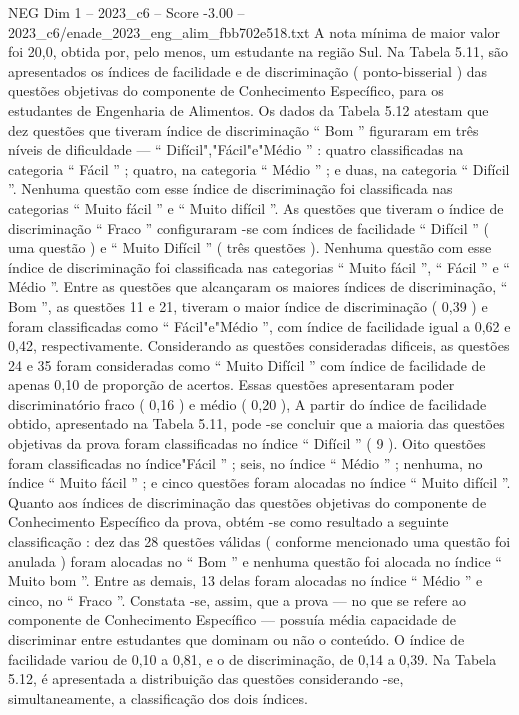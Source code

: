 \begin{textsample}{NEG Dim 1 – 2023\_c6 – Score -3.00 – 2023\_c6/enade\_2023\_eng\_alim\_fbb702e518.txt}
A nota mínima de maior valor foi 20,0, obtida por, pelo menos, um estudante na região Sul.
Na Tabela 5.11, são apresentados os índices de facilidade e de discriminação ( ponto-bisserial ) das questões objetivas do componente de Conhecimento Específico, para os estudantes de Engenharia de Alimentos.
Os dados da Tabela 5.12 atestam que dez questões que tiveram índice de discriminação “ Bom ” figuraram em três níveis de dificuldade — “ Difícil","Fácil"e"Médio ” : quatro classificadas na categoria “ Fácil ” ; quatro, na categoria “ Médio ” ; e duas, na categoria “ Difícil ”.
Nenhuma questão com esse índice de discriminação foi classificada nas categorias “ Muito fácil ” e “ Muito difícil ”.
As questões que tiveram o índice de discriminação “ Fraco ” configuraram -se com índices de facilidade “ Difícil ” ( uma questão ) e “ Muito Difícil ” ( três questões ).
Nenhuma questão com esse índice de discriminação foi classificada nas categorias “ Muito fácil ”, “ Fácil ” e “ Médio ”.
Entre as questões que alcançaram os maiores índices de discriminação, “ Bom ”, as questões 11 e 21, tiveram o maior índice de discriminação ( 0,39 ) e foram classificadas como “ Fácil"e"Médio ”, com índice de facilidade igual a 0,62 e 0,42, respectivamente.
Considerando as questões consideradas dificeis, as questões 24 e 35 foram consideradas como “ Muito Difícil ” com índice de facilidade de apenas 0,10 de proporção de acertos.
Essas questões apresentaram poder discriminatório fraco ( 0,16 ) e médio ( 0,20 ), A partir do índice de facilidade obtido, apresentado na Tabela 5.11, pode -se concluir que a maioria das questões objetivas da prova foram classificadas no índice “ Difícil ” ( 9 ).
Oito questões foram classificadas no índice"Fácil ” ; seis, no índice “ Médio ” ; nenhuma, no índice “ Muito fácil ” ; e cinco questões foram alocadas no índice “ Muito difícil ”.
Quanto aos índices de discriminação das questões objetivas do componente de Conhecimento Específico da prova, obtém -se como resultado a seguinte classificação : dez das 28 questões válidas ( conforme mencionado uma questão foi anulada ) foram alocadas no “ Bom ” e nenhuma questão foi alocada no índice “ Muito bom ”.
Entre as demais, 13 delas foram alocadas no índice “ Médio ” e cinco, no “ Fraco ”.
Constata -se, assim, que a prova — no que se refere ao componente de Conhecimento Específico — possuía média capacidade de discriminar entre estudantes que dominam ou não o conteúdo.
O índice de facilidade variou de 0,10 a 0,81, e o de discriminação, de 0,14 a 0,39.
Na Tabela 5.12, é apresentada a distribuição das questões considerando -se, simultaneamente, a classificação dos dois índices.

\end{textsample}
